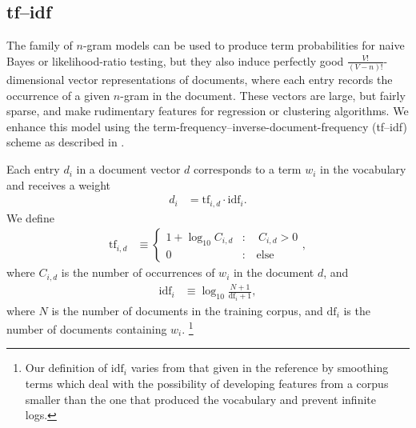 \documentclass{article}
\begin{document}
\subsection{tf--idf}
The family of $n$-gram models can be used to produce term probabilities for naive Bayes or likelihood-ratio testing, but they also induce perfectly good $\tfrac{V!}{(V-n)!}$-dimensional vector representations of documents, where each entry records the occurrence of a given $n$-gram in the document.
These vectors are large, but fairly sparse, and make rudimentary features for regression or clustering algorithms. We enhance this model using the term-frequency--inverse-document-frequency (tf--idf) scheme as described in \citet[ch. 6]{jurafsky2014speech}.



Each entry $d_i$ in a document vector $d$ corresponds to a term $w_i$ in the vocabulary and receives a weight
%
\begin{align}
  d_i &= \mathrm{tf}_{i,d} \cdot \mathrm{idf}_{i}.
\end{align}
%
We define
%
\begin{align}
  \mathrm{tf}_{i,d} &\equiv \begin{cases}
                         1 + \log_{10}C_{i,d} &:\quad C_{i,d} > 0\\
                         0 &:\quad\text{else}
                       \end{cases},
\end{align}
%
where $C_{i,d}$ is the number of occurrences of $w_i$ in the document $d$, and
%
\begin{align}
  \mathrm{idf}_i &\equiv \log_{10} \frac{N+1}{\mathrm{df}_i + 1},
\end{align}
%
where $N$ is the number of documents in the training corpus, and $\mathrm{df}_i$ is the number of documents containing $w_i$.
%
\footnote{Our definition of $\mathrm{idf}_i$ varies from that given in the reference by smoothing terms which deal with the possibility of developing features from a corpus smaller than the one that produced the vocabulary and prevent infinite logs.}
\end{document}
